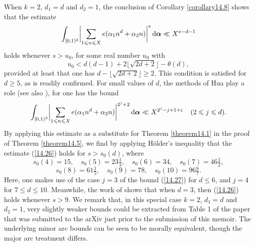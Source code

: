 \documentclass[12pt,reqno]{amsart}
\theoremstyle{definition}
\theoremstyle{remark}
\numberwithin{equation}{section}
\def\alp{{\alpha}} \def\bfalp{{\boldsymbol \alpha}}
\def\tet{{\theta}} \def\bftet{{\boldsymbol \theta}}
\def\eps{\varepsilon}
\def\le{\leqslant} \def\ge{\geqslant} \def\pleq{\preccurlyeq} \def\ple{\prec}
\def\d{{\,{\rm d}}}
\begin{document}
When $k=2$, $d_1=d$ and $d_2=1$, the conclusion of Corollary \ref{corollary14.8} shows 
that the estimate
\begin{equation}\label{14.26}
\int_{[0,1)^2} \biggl| \sum_{1\le n\le X}e(\alp_1n^d+\alp_2n)\biggr|^s\d\bfalp 
\ll X^{s-d-1}
\end{equation}
holds whenever $s>u_0$, for some real number $u_0$ with
$$u_0<d(d-1)+2\lfloor \sqrt{2d+2}\rfloor -\tet(d),$$
provided at least that one has $d-\lfloor \sqrt{2d+2}\rfloor \ge 2$. This condition is satisfied 
for $d\ge 5$, as is readily confirmed. For small values of $d$, the methods of Hua 
\cite{Hua1965} play a role (see also \cite[Lemma 5]{BR2015}), for one has the bound
\begin{equation}\label{14.27}
\int_{[0,1)^2}\biggl|\sum_{1\le n\le X}e(\alp_1n^d+\alp_2n)\biggr|^{2^j+2}\d\bfalp 
\ll X^{2^j-j+1+\eps}\quad (2\le j\le d).
\end{equation}
By applying this estimate as a substitute for Theorem \ref{theorem14.1} in the proof of 
Theorem \ref{theorem14.5}, we find by applying H\"older's inequality that the estimate 
(\ref{14.26}) holds for $s>s_0(d)$, where
$$s_0(4)=15,\quad s_0(5)=23\tfrac{1}{3},\quad s_0(6)=34,\quad s_0(7)=46\tfrac{1}{2},
$$
$$s_0(8)=61\tfrac{1}{5},\quad s_0(9)=78,\quad s_0(10)=96\tfrac{6}{7}.$$
Here, one makes use of the case $j=3$ of the bound (\ref{14.27}) for $d\le 6$, and $j=4$ 
for $7\le d\le 10$. Meanwhile, the work of \cite[Theorem 1.1]{Woo2015d} shows that when 
$d=3$, then (\ref{14.26}) holds whenever $s>9$. We remark that, in this special case 
$k=2$, $d_1=d$ and $d_2=1$, very slightly weaker bounds could be extracted from Table 1 of the paper \cite{ACHK2017} that was submitted to the arXiv just prior to the 
submission of this memoir. The underlying minor arc bounds can be seen to be morally 
equivalent, though the major arc treatment differs.
\end{document}
